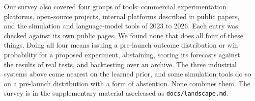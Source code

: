 \label{sec:landscape}
Our survey also covered four groups of tools: commercial experimentation platforms, open-source projects, internal platforms described in public papers, and the simulation and language-model tools of 2023 to 2026. Each entry was checked against its own public pages. We found none that does all four of these things. Doing all four means issuing a pre-launch outcome distribution or win probability for a proposed experiment, abstaining, scoring its forecasts against the results of real tests, and backtesting over an archive. The three industrial systems above come nearest on the learned prior, and some simulation tools do so on a pre-launch distribution with a form of abstention. None combines them. The survey is \iftmlr in the supplementary material as\else released as\fi{} \texttt{docs/landscape.md}.
